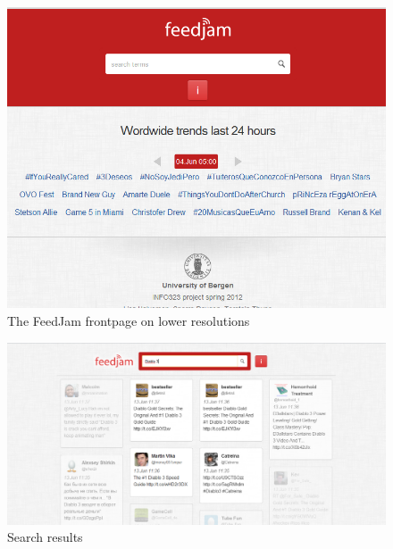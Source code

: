 \begin{figure}[ht]
    \begin{minipage}[b]{1\linewidth}
        \centering
        \includegraphics[width=1\textwidth]{figures/feedjam_responsive_frontpage}
        \caption{The FeedJam frontpage on lower resolutions}
        \label{fig:feedjamfrontpageresponsive}
    \end{minipage}
\end{figure}

\begin{figure}[ht]
    \begin{minipage}[b]{1\linewidth}
        \centering
        \includegraphics[width=1\textwidth]{figures/feedjam_search_screenshot}
        \caption{Search results}
        \label{fig:feedjamsearchresults}
    \end{minipage}
\end{figure}


